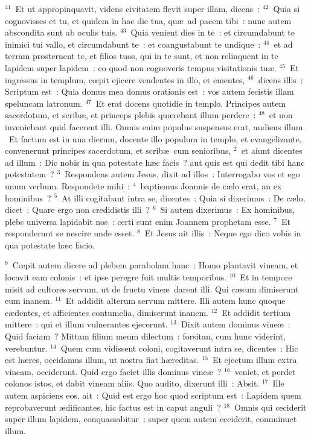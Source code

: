 ${}^{41}$~Et ut appropinquavit, videns civitatem flevit super illam, dicens~:
${}^{42}$~Quia si cognovisses et tu, et quidem in hac die tua, qu\ae\ ad pacem tibi~: nunc autem abscondita sunt ab oculis tuis.
${}^{43}$~Quia venient dies in te~: et circumdabunt te inimici tui vallo, et circumdabunt te~: et coangustabunt te undique~:
${}^{44}$~et ad terram prosternent te, et filios tuos, qui in te sunt, et non relinquent in te lapidem super lapidem~: eo quod non cognoveris tempus visitationis tu\ae .
${}^{45}$~Et ingressus in templum, cœpit ejicere vendentes in illo, et ementes,
${}^{46}$~dicens illis~: Scriptum est~: Quia domus mea domus orationis est~: vos autem fecistis illam speluncam latronum.
${}^{47}$~Et erat docens quotidie in templo. Principes autem sacerdotum, et scrib\ae , et princeps plebis qu\ae rebant illum perdere~:
${}^{48}$~et non inveniebant quid facerent illi. Omnis enim populus suspensus erat, audiens illum.
~Et factum est in una dierum, docente illo populum in templo, et evangelizante, convenerunt principes sacerdotum, et scrib\ae\ cum senioribus,
${}^{2}$~et aiunt dicentes ad illum~: Dic nobis in qua potestate h\ae c facis~? aut quis est qui dedit tibi hanc potestatem~?
${}^{3}$~Respondens autem Jesus, dixit ad illos~: Interrogabo vos et ego unum verbum. Respondete mihi~:
${}^{4}$~baptismus Joannis de c\ae lo erat, an ex hominibus~?
${}^{5}$~At illi cogitabant intra se, dicentes~: Quia si dixerimus~: De c\ae lo, dicet~: Quare ergo non credidistis illi~?
${}^{6}$~Si autem dixerimus~: Ex hominibus, plebs universa lapidabit nos~: certi sunt enim Joannem prophetam esse.
${}^{7}$~Et responderunt se nescire unde esset.
${}^{8}$~Et Jesus ait illis~: Neque ego dico vobis in qua potestate h\ae c facio.


${}^{9}$~Cœpit autem dicere ad plebem parabolam hanc~: Homo plantavit vineam, et locavit eam colonis~: et ipse peregre fuit multis temporibus.
${}^{10}$~Et in tempore misit ad cultores servum, ut de fructu vine\ae\ darent illi. Qui c\ae sum dimiserunt eum inanem.
${}^{11}$~Et addidit alterum servum mittere. Illi autem hunc quoque c\ae dentes, et afficientes contumelia, dimiserunt inanem.
${}^{12}$~Et addidit tertium mittere~: qui et illum vulnerantes ejecerunt.
${}^{13}$~Dixit autem dominus vine\ae~: Quid faciam~? Mittam filium meum dilectum~: forsitan, cum hunc viderint, verebuntur.
${}^{14}$~Quem cum vidissent coloni, cogitaverunt intra se, dicentes~: Hic est h\ae res, occidamus illum, ut nostra fiat h\ae reditas.
${}^{15}$~Et ejectum illum extra vineam, occiderunt. Quid ergo faciet illis dominus vine\ae~?
${}^{16}$~veniet, et perdet colonos istos, et dabit vineam aliis. Quo audito, dixerunt illi~: Absit.
${}^{17}$~Ille autem aspiciens eos, ait~: Quid est ergo hoc quod scriptum est~: Lapidem quem reprobaverunt \ae dificantes, hic factus est in caput anguli~?
${}^{18}$~Omnis qui ceciderit super illum lapidem, conquassabitur~: super quem autem ceciderit, comminuet illum.


